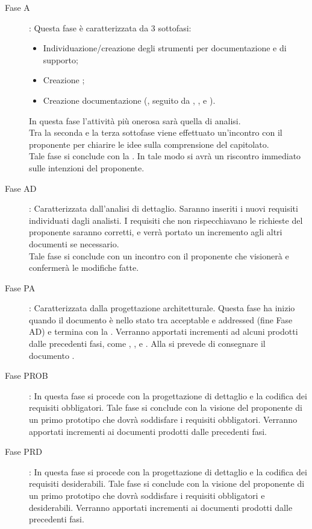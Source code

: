 		\begin{description}
			\item[Fase A]: Questa fase è caratterizzata da 3 sottofasi:
				\begin{itemize}
					\item Individuazione/creazione degli strumenti per documentazione e di supporto;
					\item Creazione ;
					\item Creazione documentazione (, seguito da , ,  e ).
				\end{itemize}
				In questa fase l'attività più onerosa sarà quella di analisi.\\Tra la seconda e la terza sottofase viene effettuato un'incontro con il proponente per chiarire le idee sulla comprensione del capitolato.\\Tale fase si conclude con la . In tale modo si avrà un riscontro immediato sulle intenzioni del proponente.
			\item[Fase AD]: Caratterizzata dall’analisi di dettaglio. Saranno inseriti i nuovi requisiti individuati dagli analisti. I requisiti che non rispecchiavano le richieste del proponente saranno corretti, e verrà portato un incremento agli altri documenti se necessario.\\Tale fase si conclude con un incontro con il proponente che visionerà e confermerà le modifiche fatte.
			\item[Fase PA]: Caratterizzata dalla progettazione architetturale. Questa fase ha inizio quando il documento  è nello stato tra acceptable e addressed (fine Fase AD) e termina con la . Verranno apportati incrementi ad alcuni prodotti dalle precedenti fasi, come , ,  e . Alla  si prevede di consegnare il documento .
			\item[Fase PROB]: In questa fase si procede con la progettazione di dettaglio e la codifica dei requisiti obbligatori. Tale fase si conclude con la visione del proponente di un primo prototipo che dovrà soddisfare i requisiti obbligatori. Verranno apportati incrementi ai documenti prodotti dalle precedenti fasi.
			\item[Fase PRD]: In questa fase si procede con la progettazione di dettaglio e la codifica dei requisiti desiderabili. Tale fase si conclude con la visione del proponente di un primo prototipo che dovrà soddisfare i requisiti obbligatori e desiderabili. Verranno apportati incrementi ai documenti prodotti dalle precedenti fasi.

\end{description}
